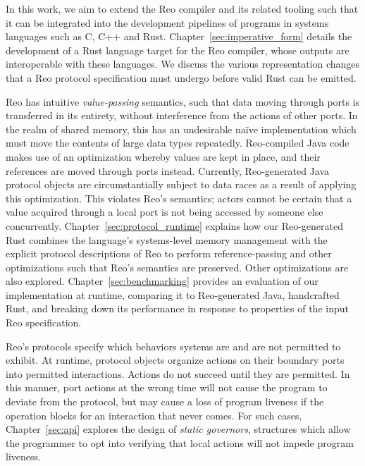 In this work, we aim to extend the Reo compiler and its related tooling such that it can be integrated into the development pipelines of programs in systems languages such as C, C++ and Rust. Chapter~\ref{sec:imperative_form} details the development of a Rust language target for the Reo compiler, whose outputs are interoperable with these languages. We discuss the various representation changes that a Reo protocol specification must undergo before valid Rust can be emitted.

Reo has intuitive \textit{value-passing} semantics, such that data moving through ports is transferred in its entirety, without interference from the actions of other ports. In the realm of shared memory, this has an undesirable na\"ive implementation which must move the contents of large data types repeatedly. Reo-compiled Java code makes use of an optimization whereby values are kept in place, and their references are moved through ports instead. Currently, Reo-generated Java protocol objects are circumstantially subject to data races as a result of applying this optimization. This violates Reo's semantics; actors cannot be certain that a value acquired through a local port is not being accessed by someone else concurrently. Chapter~\ref{sec:protocol_runtime} explains how our Reo-generated Rust combines the language's systems-level memory management with the explicit protocol descriptions of Reo to perform reference-passing and other optimizations such that Reo's semantics are preserved. Other 
optimizations are also explored. Chapter~\ref{sec:benchmarking} provides an evaluation of our implementation at runtime, comparing it to Reo-generated Java, handcrafted Rust, and breaking down its performance in response to properties of the input Reo specification.

Reo's protocols specify which behaviors systems are and are not permitted to exhibit. At runtime, protocol objects organize actions on their boundary ports into permitted interactions. Actions do not succeed until they are permitted. In this manner, port actions at the wrong time will not cause the program to deviate from the protocol, but may cause a loss of program liveness if the operation blocks for an interaction that never comes. For such cases, Chapter~\ref{sec:api} explores the design of \textit{static governors}, structures which allow the programmer to opt into verifying that local actions will not impede program liveness.
